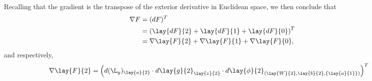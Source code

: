 Recalling that the gradient is the transpose of the exterior derivative in Euclidean space, we then conclude that
\begin{align*}
	\nabla F&=(dF)^T\\
	&=\left(\lay{dF}{2}+\lay{dF}{1}+\lay{dF}{0}\right)^T\\
	&=\nabla\lay{F}{2}+\nabla\lay{F}{1}+\nabla\lay{F}{0},
\end{align*}
and respectively,
\begin{align*}
	\nabla\lay{F}{2}&=\left(d(\L_y)_{\lay{a}{2}}\cdot d\lay{g}{2}_{\lay{z}{2}}\cdot d\lay{\phi}{2}_{(\lay{W}{2},\lay{b}{2},\{\lay{a}{1}\})}\right)^T
\end{align*}
